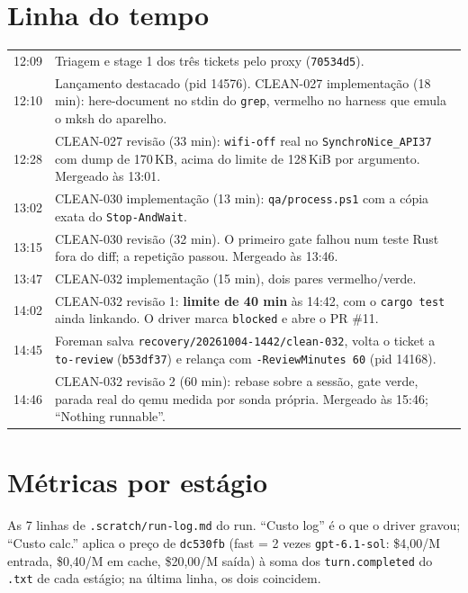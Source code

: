 \documentclass[11pt,a4paper]{article}
\begin{document}
\section{Linha do tempo}

\begin{tabularx}{\linewidth}{@{}lX@{}}
\toprule
12:09 & Triagem e stage 1 dos três tickets pelo proxy (\texttt{70534d5}).\\
12:10 & Lançamento destacado (pid 14576). CLEAN-027 implementação (18 min):
        here-document no stdin do \texttt{grep}, vermelho no harness que emula
        o mksh do aparelho.\\
12:28 & CLEAN-027 revisão (33 min): \texttt{wifi-off} real no
        \texttt{SynchroNice\_API37} com dump de 170\,KB, acima do limite de
        128\,KiB por argumento. Mergeado às 13:01.\\
13:02 & CLEAN-030 implementação (13 min): \texttt{qa/process.ps1} com a cópia
        exata do \texttt{Stop-AndWait}.\\
13:15 & CLEAN-030 revisão (32 min). O primeiro gate falhou num teste Rust fora
        do diff; a repetição passou. Mergeado às 13:46.\\
13:47 & CLEAN-032 implementação (15 min), dois pares vermelho/verde.\\
14:02 & CLEAN-032 revisão 1: \textbf{limite de 40 min} às 14:42, com o
        \texttt{cargo test} ainda linkando. O driver marca \texttt{blocked}
        e abre o PR \#11.\\
14:45 & Foreman salva \texttt{recovery/20261004-1442/clean-032}, volta o
        ticket a \texttt{to-review} (\texttt{b53df37}) e relança com
        \texttt{-ReviewMinutes 60} (pid 14168).\\
14:46 & CLEAN-032 revisão 2 (60 min): rebase sobre a sessão, gate verde,
        parada real do qemu medida por sonda própria. Mergeado às 15:46;
        ``Nothing runnable''.\\
\bottomrule
\end{tabularx}

\section{Métricas por estágio}

As 7 linhas de \texttt{.scratch/run-log.md} do run. ``Custo log'' é o que o
driver gravou; ``Custo calc.'' aplica o preço de \texttt{dc530fb} (fast = 2
vezes \texttt{gpt-6.1-sol}: \$4,00/M entrada, \$0,40/M em cache, \$20,00/M
saída) à soma dos \texttt{turn.completed} do \texttt{.txt} de cada estágio;
na última linha, os dois coincidem.
\end{document}
